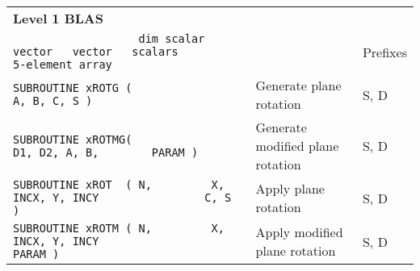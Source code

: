 \documentclass[10pt,a3paper, landscape]{article}
\begin{document}
	\pagestyle{empty}
	
	\hspace{0.5cm}
	\begin{tabular}{lll}
		\multicolumn{3}{l}{\Large{\textbf{Level 1 BLAS}}}                                                                                                                                                                                                                                                                                                                                    \\
		\verb|                   dim scalar vector   vector   scalars              5-element array     | &                                                                                                                                                                                                                                                              & Prefixes           \\
		\verb|SUBROUTINE xROTG (                                      A, B, C, S )                     | & Generate plane rotation                                                                                                                                                                                                                                      & S, D               \\
		\verb|SUBROUTINE xROTMG(                              D1, D2, A, B,        PARAM )             | & Generate modified plane rotation                                                                                                                                                                                                                             & S, D               \\
		\verb|SUBROUTINE xROT  ( N,         X, INCX, Y, INCY                C, S )                     | & Apply plane rotation                                                                                                                                                                                                                                         & S, D               \\
		\verb|SUBROUTINE xROTM ( N,         X, INCX, Y, INCY                       PARAM )             | & Apply modified plane rotation                                                                                                                                                                                                                                & S, D               \\

\end{tabular}
\end{document}
